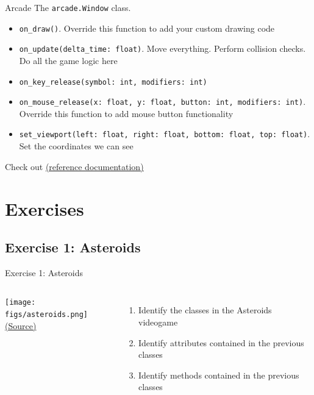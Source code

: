 \documentclass[10pt,compress]{beamer} %
\begin{document}
\begin{frame}{Arcade}
	The \texttt{arcade.Window} class.

	\begin{block}{}
		\begin{itemize}
		\item \footnotesize{\texttt{on\_draw()}}. Override this function to add your custom drawing code
		\item \footnotesize{\texttt{on\_update(delta\_time: float)}}. Move everything. Perform collision checks. Do all the game logic here
		\item \footnotesize{\texttt{on\_key\_release(symbol: int, modifiers: int)}} 
		\item \footnotesize{\texttt{on\_mouse\_release(x: float, y: float, button: int, modifiers: int)}}. Override this function to add mouse button functionality
		\item \footnotesize{\texttt{set\_viewport(left: float, right: float, bottom: float, top: float)}}. Set the coordinates we can see
		\end{itemize}
	\end{block}	

	Check out \href{https://api.arcade.academy/en/stable/api/window.html\#arcade-window}{(reference documentation)}
\end{frame}

\section{Exercises}
\subsection{Exercise 1: Asteroids}
	\begin{frame}{Exercise 1: Asteroids}
	\vspace{-0.3cm}
    \begin{columns}
		\centering \texttt{[image: figs/asteroids.png]}\\
		\tiny{\href{http://gamedevelopment.tutsplus.com/tutorials/quick-tip-intro-to-object-oriented-programming-for-game-development--gamedev-1805}{(Source)}}
	\begin{enumerate}
	\item Identify the classes in the Asteroids videogame
	\item Identify attributes contained in the previous classes
	\item Identify methods contained in the previous classes
	\end{enumerate}
	\end{columns}
\end{frame}
\end{document}
